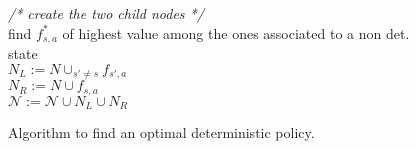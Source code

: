 \begin{figure}[h!]
{{ \hspace*{3ex} \hspace*{3ex} \hspace*{3ex} {\em {\footnotesize /* create the two child nodes */}}\\
 \hspace*{3ex} \hspace*{3ex} \hspace*{3ex} find $f^*_{s,a}$ of highest value among the ones associated to a non det. state \\
 \hspace*{3ex} \hspace*{3ex} \hspace*{3ex} $N_L := N \cup_{s' \neq s} f_{s',a}$  \\
\hspace*{3ex} \hspace*{3ex} \hspace*{3ex} $N_R := N \cup f_{s,a}$  \\
\hspace*{3ex} \hspace*{3ex} \hspace*{3ex} $\mathcal{N} := \mathcal{N} \cup N_L \cup N_R$\\
}}
\caption{Algorithm to find an optimal deterministic policy.} \label{fig:basic_bb}
\end{figure}
